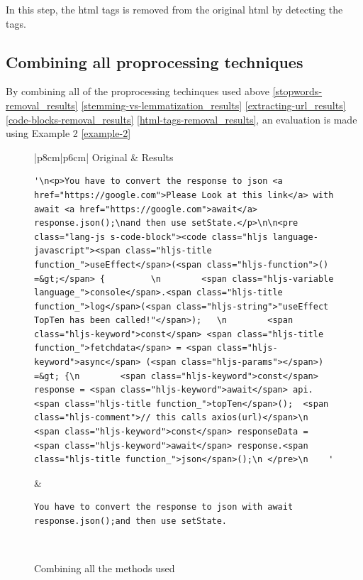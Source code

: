 \noindent In this step, the html tags is removed from the original html by detecting the tags.

\subsection{Combining all proprocessing techniques} \label{combining-all-the-methods-used_results}
By combining all of the proprocessing techinques used above \ref{stopwords-removal_results} \ref{stemming-vs-lemmatization_results} \ref{extracting-url_results} \ref{code-blocks-removal_results} \ref{html-tags-removal_results}, an evaluation is made using Example 2 \ref{example-2}
\newpage
\begin{figure}[H]
  \begin{center}
    \begin{tabular}{|p{8cm}|p{6cm}|}
    \hline\hline
    Original & Results \\ [0.5ex] %
    \hline 
    \begin{lstlisting}[frame=none]
'\n<p>You have to convert the response to json <a href="https://google.com">Please Look at this link</a> with await <a href="https://google.com">await</a> response.json();\nand then use setState.</p>\n\n<pre class="lang-js s-code-block"><code class="hljs language-javascript"><span class="hljs-title function_">useEffect</span>(<span class="hljs-function">() =&gt;</span> {         \n        <span class="hljs-variable language_">console</span>.<span class="hljs-title function_">log</span>(<span class="hljs-string">"useEffect TopTen has been called!"</span>);   \n        <span class="hljs-keyword">const</span> <span class="hljs-title function_">fetchdata</span> = <span class="hljs-keyword">async</span> (<span class="hljs-params"></span>) =&gt; {\n        <span class="hljs-keyword">const</span> response = <span class="hljs-keyword">await</span> api.<span class="hljs-title function_">topTen</span>();  <span class="hljs-comment">// this calls axios(url)</span>\n        <span class="hljs-keyword">const</span> responseData = <span class="hljs-keyword">await</span> response.<span class="hljs-title function_">json</span>();\n </pre>\n    '
    \end{lstlisting} &\begin{lstlisting}[frame=none]
You have to convert the response to json with await response.json();and then use setState. 
    \end{lstlisting} \\ 
    \hline 
    \end{tabular}
  \end{center}
  \caption{Combining all the methods used}
  \label{fig:combining-all-the-methods-used_results}
\end{figure}

